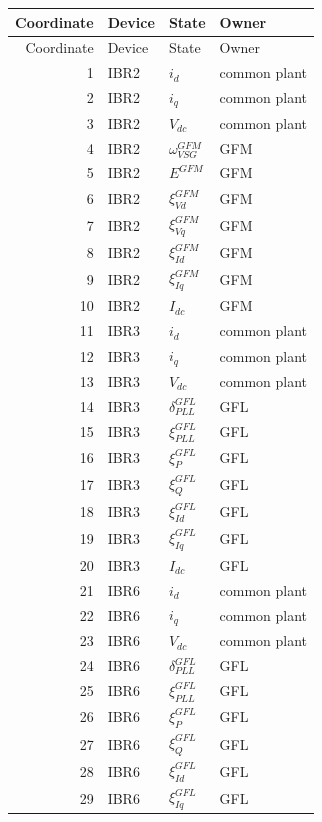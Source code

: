 \begin{longtable}{@{}r l l l@{}}
\toprule
Coordinate & Device & State & Owner \\ \midrule
\endfirsthead
\toprule
Coordinate & Device & State & Owner \\ \midrule
\endhead
1 & IBR2 & $i_d$ & common plant \\ 
2 & IBR2 & $i_q$ & common plant \\ 
3 & IBR2 & $V_{dc}$ & common plant \\ 
4 & IBR2 & $\omega_{VSG}^{GFM}$ & GFM \\ 
5 & IBR2 & $E^{GFM}$ & GFM \\ 
6 & IBR2 & $\xi_{Vd}^{GFM}$ & GFM \\ 
7 & IBR2 & $\xi_{Vq}^{GFM}$ & GFM \\ 
8 & IBR2 & $\xi_{Id}^{GFM}$ & GFM \\ 
9 & IBR2 & $\xi_{Iq}^{GFM}$ & GFM \\ 
10 & IBR2 & $I_{dc}$ & GFM \\ 
11 & IBR3 & $i_d$ & common plant \\ 
12 & IBR3 & $i_q$ & common plant \\ 
13 & IBR3 & $V_{dc}$ & common plant \\ 
14 & IBR3 & $\delta_{PLL}^{GFL}$ & GFL \\ 
15 & IBR3 & $\xi_{PLL}^{GFL}$ & GFL \\ 
16 & IBR3 & $\xi_{P}^{GFL}$ & GFL \\ 
17 & IBR3 & $\xi_{Q}^{GFL}$ & GFL \\ 
18 & IBR3 & $\xi_{Id}^{GFL}$ & GFL \\ 
19 & IBR3 & $\xi_{Iq}^{GFL}$ & GFL \\ 
20 & IBR3 & $I_{dc}$ & GFL \\ 
21 & IBR6 & $i_d$ & common plant \\ 
22 & IBR6 & $i_q$ & common plant \\ 
23 & IBR6 & $V_{dc}$ & common plant \\ 
24 & IBR6 & $\delta_{PLL}^{GFL}$ & GFL \\ 
25 & IBR6 & $\xi_{PLL}^{GFL}$ & GFL \\ 
26 & IBR6 & $\xi_{P}^{GFL}$ & GFL \\ 
27 & IBR6 & $\xi_{Q}^{GFL}$ & GFL \\ 
28 & IBR6 & $\xi_{Id}^{GFL}$ & GFL \\ 
29 & IBR6 & $\xi_{Iq}^{GFL}$ & GFL \\ 

\end{longtable}
